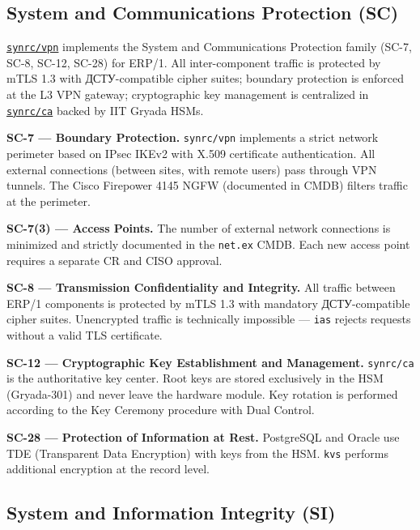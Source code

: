 \documentclass{article}
\begin{document}
\subsection{System and Communications Protection (SC)}

\href{https://github.com/synrc/vpn}{\texttt{synrc/vpn}} implements the System and Communications Protection family (SC-7, SC-8, SC-12, SC-28) for ERP/1. All inter-component traffic is protected by mTLS 1.3 with \foreignlanguage{ukrainian}{ДСТУ}-compatible cipher suites; boundary protection is enforced at the L3 VPN gateway; cryptographic key management is centralized in \href{https://github.com/synrc/ca}{\texttt{synrc/ca}} backed by IIT Gryada HSMs.

\textbf{SC-7 --- Boundary Protection.}
\texttt{synrc/vpn} implements a strict network perimeter based on IPsec IKEv2 with X.509 certificate authentication. All external connections (between sites, with remote users) pass through VPN tunnels. The Cisco Firepower 4145 NGFW (documented in CMDB) filters traffic at the perimeter.

\textbf{SC-7(3) --- Access Points.}
The number of external network connections is minimized and strictly documented in the \texttt{net.ex} CMDB. Each new access point requires a separate CR and CISO approval.

\textbf{SC-8 --- Transmission Confidentiality and Integrity.}
All traffic between ERP/1 components is protected by mTLS 1.3 with mandatory \foreignlanguage{ukrainian}{\foreignlanguage{ukrainian}{ДСТУ}-compatible} cipher suites. Unencrypted traffic is technically impossible --- \texttt{ias} rejects requests without a valid TLS certificate.

\textbf{SC-12 --- Cryptographic Key Establishment and Management.}
\texttt{synrc/ca} is the authoritative key center. Root keys are stored exclusively in the HSM (Gryada-301) and never leave the hardware module. Key rotation is performed according to the Key Ceremony procedure with Dual Control.

\textbf{SC-28 --- Protection of Information at Rest.}
PostgreSQL and Oracle use TDE (Transparent Data Encryption) with keys from the HSM. \texttt{kvs} performs additional encryption at the record level.

\subsection{System and Information Integrity (SI)}
\end{document}
